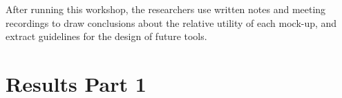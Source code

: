 After running this workshop, the researchers use written notes and meeting recordings to draw conclusions about the relative utility of each mock-up, and extract guidelines for the design of future tools.

\section{Results Part 1}
